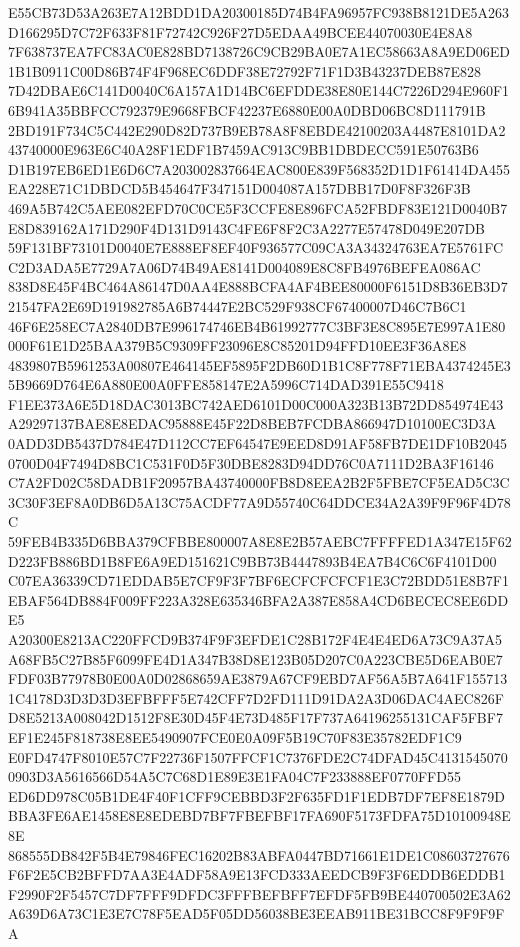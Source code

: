 \documentclass[UTF8,fontset=fandol,zihao=-4,a4paper]{ctexart}
\begin{document}
{{E55CB73D53A263E7A12BDD1DA20300185D74B4FA96957FC938B8121DE5A263D166295D7C72F633F81F72742C926F27D5EDAA49BCEE44070030E4E8A8
7F638737EA7FC83AC0E828BD7138726C9CB29BA0E7A1EC58663A8A9ED06ED1B1B0911C00D86B74F4F968EC6DDF38E72792F71F1D3B43237DEB87E828
7D42DBAE6C141D0040C6A157A1D14BC6EFDDE38E80E144C7226D294E960F16B941A35BBFCC792379E9668FBCF42237E6880E00A0DBD06BC8D111791B
2BD191F734C5C442E290D82D737B9EB78A8F8EBDE42100203A4487E8101DA243740000E963E6C40A28F1EDF1B7459AC913C9BB1DBDECC591E50763B6
D1B197EB6ED1E6D6C7A203002837664EAC800E839F568352D1D1F61414DA455EA228E71C1DBDCD5B454647F347151D004087A157DBB17D0F8F326F3B
469A5B742C5AEE082EFD70C0CE5F3CCFE8E896FCA52FBDF83E121D0040B7E8D839162A171D290F4D131D9143C4FE6F8F2C3A2277E57478D049E207DB
59F131BF73101D0040E7E888EF8EF40F936577C09CA3A34324763EA7E5761FCC2D3ADA5E7729A7A06D74B49AE8141D004089E8C8FB4976BEFEA086AC
838D8E45F4BC464A86147D0AA4E888BCFA4AF4BEE80000F6151D8B36EB3D721547FA2E69D191982785A6B74447E2BC529F938CF67400007D46C7B6C1
46F6E258EC7A2840DB7E996174746EB4B61992777C3BF3E8C895E7E997A1E80000F61E1D25BAA379B5C9309FF23096E8C85201D94FFD10EE3F36A8E8
4839807B5961253A00807E464145EF5895F2DB60D1B1C8F778F71EBA4374245E35B9669D764E6A880E00A0FFE858147E2A5996C714DAD391E55C9418
F1EE373A6E5D18DAC3013BC742AED6101D00C000A323B13B72DD854974E43A29297137BAE8E8EDAC95888E45F22D8BEB7FCDBA866947D10100EC3D3A
0ADD3DB5437D784E47D112CC7EF64547E9EED8D91AF58FB7DE1DF10B20450700D04F7494D8BC1C531F0D5F30DBE8283D94DD76C0A7111D2BA3F16146
C7A2FD02C58DADB1F20957BA43740000FB8D8EEA2B2F5FBE7CF5EAD5C3C3C30F3EF8A0DB6D5A13C75ACDF77A9D55740C64DDCE34A2A39F9F96F4D78C
59FEB4B335D6BBA379CFBBE800007A8E8E2B57AEBC7FFFFED1A347E15F62D223FB886BD1B8FE6A9ED151621C9BB73B4447893B4EA7B4C6C6F4101D00
C07EA36339CD71EDDAB5E7CF9F3F7BF6ECFCFCFCF1E3C72BDD51E8B7F1EBAF564DB884F009FF223A328E635346BFA2A387E858A4CD6BECEC8EE6DDE5
A20300E8213AC220FFCD9B374F9F3EFDE1C28B172F4E4E4ED6A73C9A37A5A68FB5C27B85F6099FE4D1A347B38D8E123B05D207C0A223CBE5D6EAB0E7
FDF03B77978B0E00A0D02868659AE3879A67CF9EBD7AF56A5B7A641F1557131C4178D3D3D3D3EFBFFF5E742CFF7D2FD111D91DA2A3D06DAC4AEC826F
D8E5213A008042D1512F8E30D45F4E73D485F17F737A64196255131CAF5FBF7EF1E245F818738E8EE5490907FCE0E0A09F5B19C70F83E35782EDF1C9
E0FD4747F8010E57C7F22736F1507FFCF1C7376FDE2C74DFAD45C41315450700903D3A5616566D54A5C7C68D1E89E3E1FA04C7F233888EF0770FFD55
ED6DD978C05B1DE4F40F1CFF9CEBBD3F2F635FD1F1EDB7DF7EF8E1879DBBA3FE6AE1458E8E8EDEBD7BF7FBEFBF17FA690F5173FDFA75D10100948E8E
868555DB842F5B4E79846FEC16202B83ABFA0447BD71661E1DE1C08603727676F6F2E5CB2BFFD7AA3E4ADF58A9E13FCD333AEEDCB9F3F6EDDB6EDDB1
F2990F2F5457C7DF7FFF9DFDC3FFFBEFBFF7EFDF5FB9BE440700502E3A62A639D6A73C1E3E7C78F5EAD5F05DD56038BE3EEAB911BE31BCC8F9F9F9FA
}}
\end{document}

